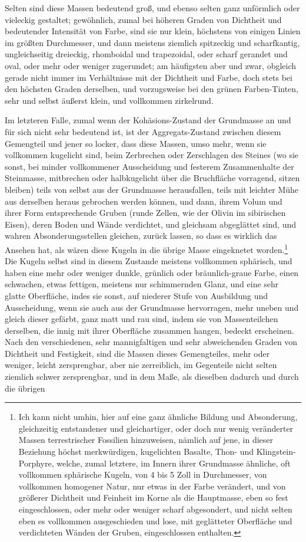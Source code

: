 \documentclass[a4paper, 11pt, oneside, german]{article}
\begin{document}
Selten sind diese Massen bedeutend groß, und ebenso selten ganz unförmlich oder vieleckig gestaltet; gewöhnlich, zumal bei höheren Graden von Dichtheit und bedeutender Intensität von Farbe, sind sie nur klein, höchstens von einigen Linien im größten Durchmesser, und dann meistens ziemlich spitzeckig und scharfkantig, ungleichseitig dreieckig, rhomboidal und trapezoidal, oder scharf gerandet und oval, oder mehr oder weniger zugerundet; am häufigsten aber und zwar, obgleich gerade nicht immer im Verhältnisse mit der Dichtheit und Farbe, doch stets bei den höchsten Graden derselben, und vorzugsweise bei den grünen Farben-Tinten, sehr und selbst äußerst klein, und vollkommen zirkelrund.

Im letzteren Falle, zumal wenn der Kohäsions-Zustand der Grundmasse an und für sich nicht sehr bedeutend ist, ist der Aggregats-Zustand zwischen diesem Gemengteil und jener so locker, dass diese Massen, umso mehr, wenn sie vollkommen kugelicht sind, beim Zerbrechen oder Zerschlagen des Steines (wo sie sonst, bei minder vollkommener Ausscheidung und festerem Zusammenhalte der Steinmasse, mitbrechen oder halbkugelicht über die Bruchfläche vorragend, sitzen bleiben) teils von selbst aus der Grundmasse herausfallen, teils mit leichter Mühe aus derselben heraus gebrochen werden können, und dann, ihrem Volum und ihrer Form entsprechende Gruben (runde Zellen, wie der Olivin im sibirischen Eisen), deren Boden und Wände verdichtet, und gleichsam abgeglättet sind, und wahren Absonderungsstellen gleichen, zurück lassen, so dass es wirklich das Ansehen hat, als wären diese Kugeln in die übrige Masse eingeknetet worden.\footnote{Ich kann nicht umhin, hier auf eine ganz ähnliche Bildung und Absonderung, gleichzeitig entstandener und gleichartiger, oder doch nur wenig veränderter Massen terrestrischer Fossilien hinzuweisen, nämlich auf jene, in dieser Beziehung höchst merkwürdigen, kugelichten Basalte, Thon- und Klingstein-Porphyre, welche, zumal letztere, im Innern ihrer Grundmasse ähnliche, oft vollkommen sphärische Kugeln, von 4 bis 5 Zoll in Durchmesser, von vollkommen homogener Natur, nur etwas in der Farbe verändert, und von größerer Dichtheit und Feinheit im Korne als die Hauptmasse, eben so fest eingeschlossen, oder mehr oder weniger scharf abgesondert, und nicht selten eben es vollkommen ausgeschieden und lose, mit geglätteter Oberfläche und verdichteten Wänden der Gruben, eingeschlossen enthalten.} Die Kugeln selbst sind in diesem Zustande meistens vollkommen sphärisch, und haben eine mehr oder weniger dunkle, grünlich oder bräunlich-graue Farbe, einen schwachen, etwas fettigen, meistens nur schimmernden Glanz, und eine sehr glatte Oberfläche, indes sie sonst, auf niederer Stufe von Ausbildung und Ausscheidung, wenn sie auch aus der Grundmasse hervorragen, mehr uneben und gleich dieser gefärbt, ganz matt und rau sind, indem sie von Massenteilchen derselben, die innig mit ihrer Oberfläche zusammen hangen, bedeckt erscheinen. Nach den verschiedenen, sehr mannigfaltigen und sehr abweichenden Graden von Dichtheit und Festigkeit, sind die Massen dieses Gemengteiles, mehr oder weniger, leicht zersprengbar, aber nie zerreiblich, im Gegenteile nicht selten ziemlich schwer zersprengbar, und in dem Maße, als dieselben dadurch und durch die übrigen 
\end{document}

